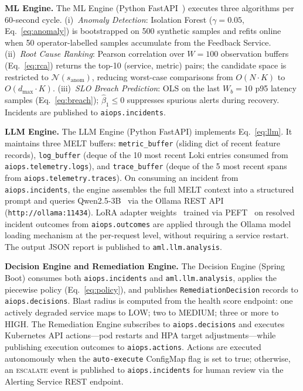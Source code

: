 \documentclass[a4paper]{lipics-v2021}
\newcommand{\mypara}[1]{{\vspace{0.1mm}\noindent\textbf{#1}}}
\begin{document}
\mypara{ML Engine.}
The ML Engine (Python FastAPI~\cite{fastapi2018}) executes three algorithms per
60-second cycle. (i)~\textit{Anomaly Detection}: Isolation Forest
($\gamma{=}0.05$, Eq.~\ref{eq:anomaly}) is bootstrapped on 500 synthetic samples
and refits online when 50 operator-labelled samples accumulate from the Feedback
Service. (ii)~\textit{Root Cause Ranking}: Pearson correlation over $W{=}100$
observation buffers (Eq.~\ref{eq:rca}) returns the top-10 (service, metric) pairs;
the candidate space is restricted to $\mathcal{N}(s_{\text{anom}})$, reducing
worst-case comparisons from $O(N{\cdot}K)$ to $O(d_{\max}{\cdot}K)$.
(iii)~\textit{SLO Breach Prediction}: OLS on the last $W_b{=}10$ p95 latency
samples (Eq.~\ref{eq:breach}); $\hat{\beta}_1 \leq 0$ suppresses spurious alerts
during recovery. Incidents are published to \texttt{aiops.incidents}.

\mypara{LLM Engine.}
The LLM Engine (Python FastAPI) implements Eq.~\ref{eq:llm}. It maintains three MELT
buffers: \texttt{metric\_buffer} (sliding dict of recent feature records),
\texttt{log\_buffer} (deque of the 10 most recent Loki entries consumed from
\texttt{aiops.telemetry.logs}), and \texttt{trace\_buffer} (deque of the 5 most
recent spans from \texttt{aiops.telemetry.traces}). On consuming an incident from
\texttt{aiops.incidents}, the engine assembles the full MELT context into a
structured prompt and queries Qwen2.5-3B~\cite{qwen2024} via the Ollama REST API
(\texttt{http://ollama:11434}). LoRA adapter weights~\cite{hu2022lora} trained via
PEFT~\cite{peft2022} on resolved incident outcomes from \texttt{aiops.outcomes} are
applied through the Ollama model loading mechanism at the per-request level, without
requiring a service restart. The output JSON report is published to
\texttt{aml.llm.analysis}.

\mypara{Decision Engine and Remediation Engine.}
The Decision Engine (Spring Boot) consumes both \texttt{aiops.incidents} and
\texttt{aml.llm.analysis}, applies the piecewise policy (Eq.~\ref{eq:policy}), and
publishes \texttt{RemediationDecision} records to \texttt{aiops.decisions}. Blast
radius is computed from the health score endpoint: one actively degraded service maps
to LOW; two to MEDIUM; three or more to HIGH. The Remediation Engine subscribes to
\texttt{aiops.decisions} and executes Kubernetes API actions---pod restarts and HPA
target adjustments---while publishing execution outcomes to \texttt{aiops.actions}.
Actions are executed autonomously when the \texttt{auto-execute} ConfigMap flag is
set to true; otherwise, an \textsc{escalate} event is published to
\texttt{aiops.incidents} for human review via the Alerting Service REST endpoint.
\end{document}
